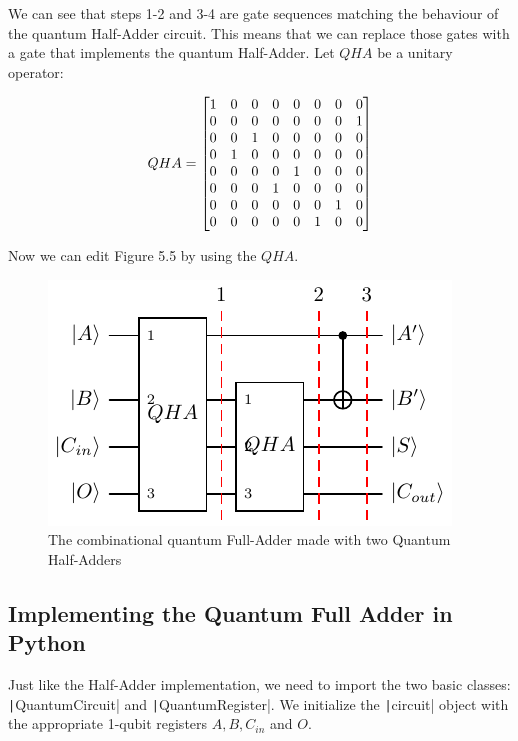 We can see that steps 1-2 and 3-4 are gate sequences matching the behaviour of the quantum Half-Adder circuit. This means that we can replace
those gates with a gate that implements the quantum Half-Adder. Let $QHA$ be a unitary operator:

\begin{equation}
    \centering
    QHA = \begin{bmatrix}
        1 & 0 & 0 & 0 & 0 & 0 & 0 & 0  \\
         0 & 0 & 0 & 0 & 0 & 0 & 0 & 1  \\
         0 & 0 & 1 & 0 & 0 & 0 & 0 & 0  \\
         0 & 1 & 0 & 0 & 0 & 0 & 0 & 0  \\
         0 & 0 & 0 & 0 & 1 & 0 & 0 & 0  \\
         0 & 0 & 0 & 1 & 0 & 0 & 0 & 0  \\
         0 & 0 & 0 & 0 & 0 & 0 & 1 & 0  \\
         0 & 0 & 0 & 0 & 0 & 1 & 0 & 0  \\
         \end{bmatrix}
\end{equation}

Now we can edit Figure 5.5 by using the $QHA$.

\begin{figure}[ht]
    \centering
    \includegraphics{images/5_Implementation/combinational_full_adder.pdf}
    \caption{The combinational quantum Full-Adder made with two Quantum Half-Adders}
\end{figure}

\subsection{Implementing the Quantum Full Adder in Python}

Just like the Half-Adder implementation, we need to import the two basic classes: \\\texttt|QuantumCircuit| and
\texttt|QuantumRegister|. We initialize the \texttt|circuit| object with the appropriate 1-qubit
registers $A,B,C_{in}$ and $O$.

